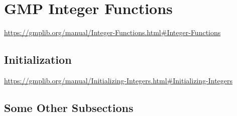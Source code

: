 \section{GMP Integer Functions}

\url{https://gmplib.org/manual/Integer-Functions.html#Integer-Functions}


\subsection{Initialization}

\url{https://gmplib.org/manual/Initializing-Integers.html#Initializing-Integers}


\subsection{Some Other Subsections}
